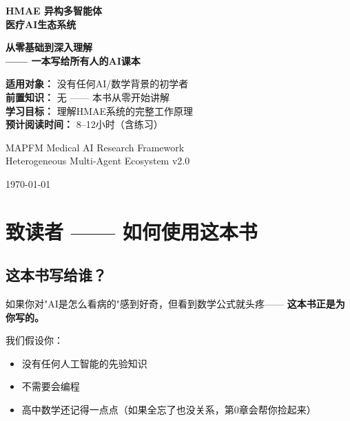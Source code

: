 \documentclass[11pt,a4paper]{ctexart}
\begin{document}
\begin{titlepage}
\centering
\vspace*{3cm}

{\Huge\bfseries HMAE 异构多智能体\\[8pt] 医疗AI生态系统}

\vspace{1.5cm}

{\LARGE\bfseries 从零基础到深入理解\\[8pt] —— 一本写给所有人的AI课本}

\vspace{2cm}

{\large
\textbf{适用对象：} 没有任何AI/数学背景的初学者\\
\textbf{前置知识：} 无 —— 本书从零开始讲解\\
\textbf{学习目标：} 理解HMAE系统的完整工作原理\\
\textbf{预计阅读时间：} 8--12小时（含练习）
}

\vspace{2cm}

{\large
MAPFM Medical AI Research Framework\\[4pt]
Heterogeneous Multi-Agent Ecosystem v2.0
}

\vfill
{\large \today}
\end{titlepage}

\section*{致读者 —— 如何使用这本书}

\subsection*{这本书写给谁？}

如果你对"AI是怎么看病的"感到好奇，但看到数学公式就头疼——
\textbf{这本书正是为你写的。}

我们假设你：
\begin{itemize}[nosep]
\item 没有任何人工智能的先验知识
\item 不需要会编程
\item 高中数学还记得一点点（如果全忘了也没关系，第0章会帮你捡起来）
\end{itemize}
\end{document}
